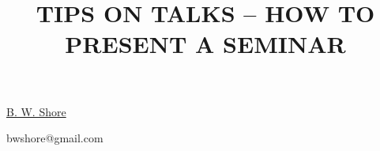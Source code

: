 \title{TIPS ON TALKS -- HOW TO PRESENT A SEMINAR}

\underline{B. W. Shore}  


\email bwshore@gmail.com


\vspace{\baselineskip}